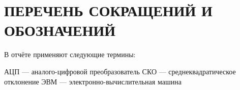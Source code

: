 \section*{ПЕРЕЧЕНЬ СОКРАЩЕНИЙ И ОБОЗНАЧЕНИЙ}

В отчёте применяют следующие термины:

АЦП — аналого-цифровой преобразователь
СКО — среднеквадратическое отклонение
ЭВМ — электронно-вычислительная машина
